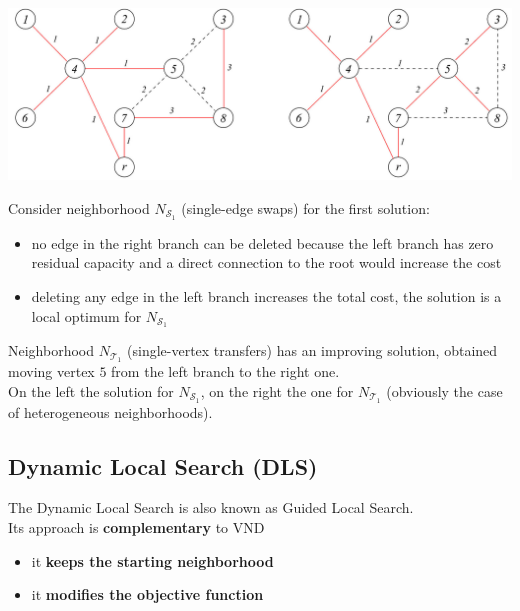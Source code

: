 \documentclass[11pt]{article}
\begin{document}
	\begin{center}
		\includegraphics[width=\columnwidth]{img/CMST4}
	\end{center}
	
	Consider neighborhood $N_{\mathcal{S}_1}$ (single-edge swaps) for the first solution:
	\begin{itemize}
		\item no edge in the right branch can be deleted because the left branch has zero residual capacity and a direct connection to the root would increase the cost
		
		\item deleting any edge in the left branch increases the total cost, the solution is a local optimum for $N_{\mathcal{S}_1}$
	\end{itemize} 
	
	Neighborhood $N_{\mathcal{T}_1}$ (single-vertex transfers) has an improving solution, obtained moving vertex $5$ from the left branch to the right one.\\
	
	On the left the solution for $N_{\mathcal{S}_1}$, on the right the one for $N_{\mathcal{T}_1}$ (obviously the case of heterogeneous neighborhoods).\\
	
	\newpage
	
	\subsection{Dynamic Local Search (DLS)}
	
	The Dynamic Local Search is also known as Guided Local Search.\\
	
	Its approach is \textbf{complementary} to VND
	\begin{itemize}
		\item it \textbf{keeps the starting neighborhood}
		\item it \textbf{modifies the objective function}
	\end{itemize}
	
\end{document}
